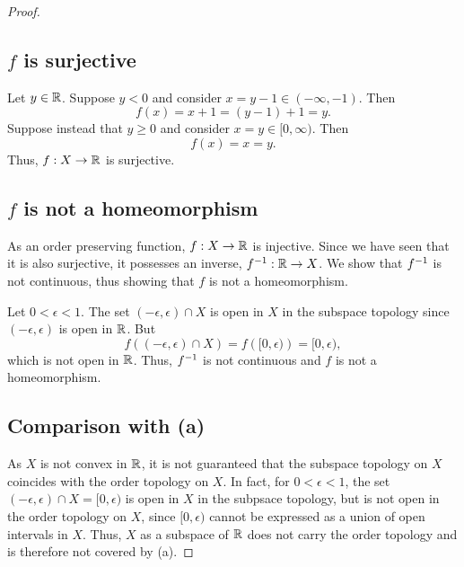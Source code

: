 \begin{solution}
\begin{proof}
    \subsection*{$f$ is surjective}
    Let $y \in \mathbb{R}$.
    Suppose $y < 0$ and consider $x = y - 1 \in (-\infty, -1)$.
    Then
    \begin{equation*}
      f(x) = x + 1 = (y - 1) + 1 = y.
    \end{equation*}
    Suppose instead that $y \geq 0$ and consider $x = y \in [0, \infty)$.
    Then
    \begin{equation*}
      f(x) = x = y.
    \end{equation*}
    Thus, $f: X \rightarrow \mathbb{R}$ is surjective.
    
    \subsection*{$f$ is not a homeomorphism}
    As an order preserving function, $f: X \rightarrow \mathbb{R}$ is injective.
    Since we have seen that it is also surjective, it possesses an inverse, $f^{-1}: \mathbb{R} \rightarrow X$.
    We show that $f^{-1}$ is not continuous, thus showing that $f$ is not a homeomorphism.

    Let $0 < \epsilon < 1$.
    The set $(-\epsilon, \epsilon) \cap X$ is open in $X$ in the subspace topology since $(-\epsilon, \epsilon)$ is open in $\mathbb{R}$.
    But
    \begin{equation*}
      f\left((-\epsilon, \epsilon) \cap X\right) = f\left([0, \epsilon)\right) = [0, \epsilon),
    \end{equation*}
    which is not open in $\mathbb{R}$.
    Thus, $f^{-1}$ is not continuous and $f$ is not a homeomorphism.

    \subsection*{Comparison with (a)}
    As $X$ is not convex in $\mathbb{R}$, it is not guaranteed that the subspace topology on $X$ coincides with the order topology on $X$.
    In fact, for $0 < \epsilon < 1$, the set $(-\epsilon, \epsilon) \cap X = [0, \epsilon)$ is open in $X$ in the subpsace topology, but is not open in the order topology on $X$, since $[0, \epsilon)$ cannot be expressed as a union of open intervals in $X$.
    Thus, $X$ as a subspace of $\mathbb{R}$ does not carry the order topology and is therefore not covered by (a).
  \end{proof}
\end{solution}
%
\newpage

